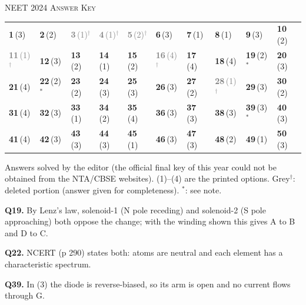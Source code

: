 \par{}\vspace{14pt}
\begin{center}{}\par
{\large\color{navy}\scshape NEET 2024 \textperiodcentered{} Answer Key}\end{center}
{\small\setlength{\tabcolsep}{1pt}\renewcommand{\arraystretch}{1.5}
\begin{tabularx}{\linewidth}{@{}*{10}{>{\centering\arraybackslash}X}@{}}\toprule
\textbf{1}\,(3) & \textbf{2}\,(2) & \textcolor{gray}{\textbf{3}\,(1)$^{\dagger}$} & \textcolor{gray}{\textbf{4}\,(1)$^{\dagger}$} & \textcolor{gray}{\textbf{5}\,(2)$^{\dagger}$} & \textbf{6}\,(3) & \textbf{7}\,(1) & \textbf{8}\,(1) & \textbf{9}\,(3) & \textbf{10}\,(2)\\
\textcolor{gray}{\textbf{11}\,(1)$^{\dagger}$} & \textbf{12}\,(3) & \textbf{13}\,(2) & \textbf{14}\,(1) & \textbf{15}\,(2) & \textcolor{gray}{\textbf{16}\,(4)$^{\dagger}$} & \textbf{17}\,(4) & \textbf{18}\,(4) & \textbf{19}\,(2)$^{*}$ & \textbf{20}\,(3)\\
\textbf{21}\,(4) & \textbf{22}\,(2)$^{*}$ & \textbf{23}\,(2) & \textbf{24}\,(3) & \textbf{25}\,(3) & \textbf{26}\,(3) & \textbf{27}\,(2) & \textcolor{gray}{\textbf{28}\,(1)$^{\dagger}$} & \textbf{29}\,(3) & \textbf{30}\,(2)\\
\textbf{31}\,(4) & \textbf{32}\,(3) & \textbf{33}\,(1) & \textbf{34}\,(2) & \textbf{35}\,(4) & \textbf{36}\,(3) & \textbf{37}\,(3) & \textbf{38}\,(3) & \textbf{39}\,(3)$^{*}$ & \textbf{40}\,(3)\\
\textbf{41}\,(4) & \textbf{42}\,(3) & \textbf{43}\,(3) & \textbf{44}\,(3) & \textbf{45}\,(1) & \textbf{46}\,(3) & \textbf{47}\,(3) & \textbf{48}\,(2) & \textbf{49}\,(1) & \textbf{50}\,(3)\\\bottomrule\end{tabularx}}\par\smallskip
{\footnotesize Answers solved by the editor (the official final key of this year could not be obtained from the NTA/CBSE websites). (1)--(4) are the printed options. {\color{gray}Grey$^{\dagger}$}: deleted portion (answer given for completeness). $^{*}$: see note.\par
\par\smallskip\textbf{Q19.} By Lenz's law, solenoid-1 (N pole receding) and solenoid-2 (S pole approaching) both oppose the change; with the winding shown this gives A to B and D to C.
\par\smallskip\textbf{Q22.} NCERT (p 290) states both: atoms are neutral and each element has a characteristic spectrum.
\par\smallskip\textbf{Q39.} In (3) the diode is reverse-biased, so its arm is open and no current flows through G.
}\par
